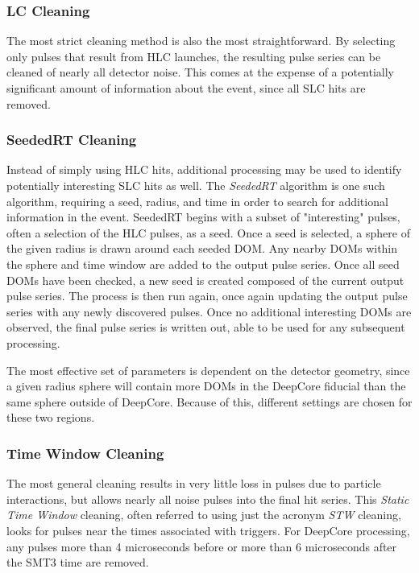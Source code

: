 \subsubsection{LC Cleaning}
The most strict cleaning method is also the most straightforward. 
By selecting only pulses that result from HLC launches, the resulting pulse series can be cleaned of nearly all detector noise.
This comes at the expense of a potentially significant amount of information about the event, since all SLC hits are removed.

\subsubsection{SeededRT Cleaning}
Instead of simply using HLC hits, additional processing may be used to identify potentially interesting SLC hits as well.
The \emph{SeededRT} algorithm is one such algorithm, requiring a seed, radius, and time in order to search for additional information in the event.
SeededRT begins with a subset of "interesting" pulses, often a selection of the HLC pulses, as a seed.
Once a seed is selected, a sphere of the given radius is drawn around each seeded DOM. 
Any nearby DOMs within the sphere and time window are added to the output pulse series.
Once all seed DOMs have been checked, a new seed is created composed of the current output pulse series.
The process is then run again, once again updating the output pulse series with any newly discovered pulses.
Once no additional interesting DOMs are observed, the final pulse series is written out, able to be used for any subsequent processing.

The most effective set of parameters is dependent on the detector geometry, since a given radius sphere will contain more DOMs in the DeepCore fiducial than the same sphere outside of DeepCore.
Because of this, different settings are chosen for these two regions.

\subsubsection{Time Window Cleaning}
The most general cleaning results in very little loss in pulses due to particle interactions, but allows nearly all noise pulses into the final hit series.
This \emph{Static Time Window} cleaning, often referred to using just the acronym \emph{STW} cleaning, looks for pulses near the times associated with triggers.
For DeepCore processing, any pulses more than 4 microseconds before or more than 6 microseconds after the SMT3 time are removed.

